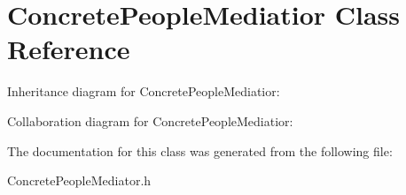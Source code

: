 \hypertarget{classConcretePeopleMediatior}{}\section{Concrete\+People\+Mediatior Class Reference}
\label{classConcretePeopleMediatior}


Inheritance diagram for Concrete\+People\+Mediatior\+:


Collaboration diagram for Concrete\+People\+Mediatior\+:


The documentation for this class was generated from the following file\+:\begin{DoxyCompactItemize}
\item 
Concrete\+People\+Mediator.\+h\end{DoxyCompactItemize}
